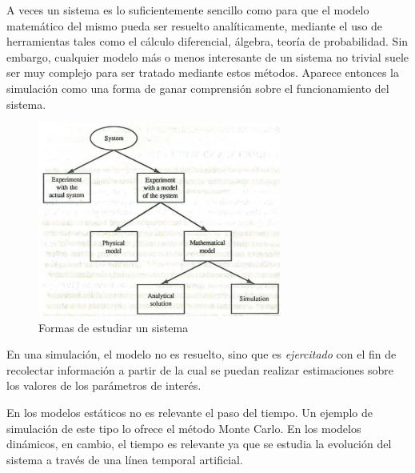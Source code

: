 \documentclass[]{article}
\begin{document}
A veces un sistema es lo suficientemente sencillo como para que el modelo
matemático del mismo pueda ser resuelto analíticamente, mediante el uso de
herramientas tales como el cálculo diferencial, álgebra, teoría de
probabilidad. Sin embargo, cualquier modelo más o menos interesante de un
sistema no trivial suele ser muy complejo para ser tratado mediante estos
métodos. Aparece entonces la simulación como una forma de ganar comprensión
sobre el funcionamiento del sistema.

\begin{figure}[h]
\caption{Formas de estudiar un sistema}
\centering
\includegraphics[width=8cm]{taxonomia_enfoques}
\end{figure}

En una simulación, el modelo no es resuelto, sino que es \textit{ejercitado}
con el fin de recolectar información a partir de la cual se puedan realizar
estimaciones sobre los valores de los parámetros de interés.

En los modelos estáticos no es relevante el paso del tiempo. Un ejemplo de
simulación de este tipo lo ofrece el método Monte Carlo. En los modelos
dinámicos, en cambio, el tiempo es relevante ya que se estudia la evolución del
sistema a través de una línea temporal artificial.
\end{document}
